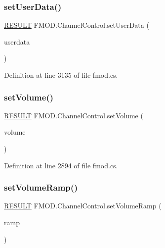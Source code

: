 \subsubsection{\texorpdfstring{set\+User\+Data()}{setUserData()}}
{\footnotesize\ttfamily \hyperlink{namespace_f_m_o_d_a305d1176ef3f8c8815861a60407ac33d}{R\+E\+S\+U\+LT} F\+M\+O\+D.\+Channel\+Control.\+set\+User\+Data (\begin{DoxyParamCaption}\item[{Int\+Ptr}]{userdata }\end{DoxyParamCaption})}



Definition at line 3135 of file fmod.\+cs.

\mbox{\label{class_f_m_o_d_1_1_channel_control_aa47164360aab2989605a38952f5e8d8a}} 
\subsubsection{\texorpdfstring{set\+Volume()}{setVolume()}}
{\footnotesize\ttfamily \hyperlink{namespace_f_m_o_d_a305d1176ef3f8c8815861a60407ac33d}{R\+E\+S\+U\+LT} F\+M\+O\+D.\+Channel\+Control.\+set\+Volume (\begin{DoxyParamCaption}\item[{float}]{volume }\end{DoxyParamCaption})}



Definition at line 2894 of file fmod.\+cs.

\mbox{\label{class_f_m_o_d_1_1_channel_control_af632bb7c0d713a2193e0fa6b966c401e}} 
\subsubsection{\texorpdfstring{set\+Volume\+Ramp()}{setVolumeRamp()}}
{\footnotesize\ttfamily \hyperlink{namespace_f_m_o_d_a305d1176ef3f8c8815861a60407ac33d}{R\+E\+S\+U\+LT} F\+M\+O\+D.\+Channel\+Control.\+set\+Volume\+Ramp (\begin{DoxyParamCaption}\item[{bool}]{ramp }\end{DoxyParamCaption})}



